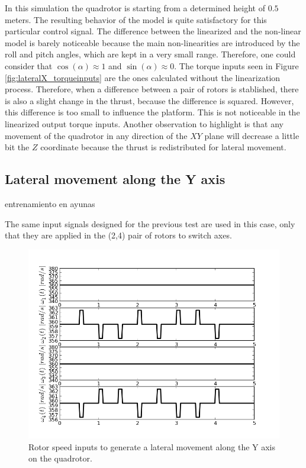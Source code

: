 In this simulation the quadrotor is starting from a determined height of $0.5$ meters. The resulting behavior of the model is quite satisfactory for this particular control signal. The difference between the linearized and the non-linear model is barely noticeable because the main non-linearities are introduced by the roll and pitch angles, which are kept in a very small range. Therefore, one could consider that $\cos{(\alpha)} \approx 1$ and $\sin{(\alpha)} \approx 0$. The torque inputs seen in Figure \ref{fig:lateralX_torqueinputs} are the ones calculated without the linearization process. Therefore, when a difference between a pair of rotors is stablished, there is also a slight change in the thrust, because the difference is squared. However, this difference is too small to influence the platform. This is not noticeable in the linearized output torque inputs. Another observation to highlight is that any movement of the quadrotor in any direction of the $XY$ plane will decrease a little bit the $Z$ coordinate because the thrust is redistributed for lateral movement. \newpage

\subsection{Lateral movement along the Y axis}entrenamiento en ayunas

The same input signals designed for the previous test are used in this case, only that they are applied in the (2,4) pair of rotors to switch axes.

\begin{figure}[H]
\centering
\includegraphics[scale=0.7]{Images/Chapter3/Lateral_Y/Inputs.png}
\caption{Rotor speed inputs to generate a lateral movement along the Y axis on the quadrotor.}
\label{fig:lateralY_inputs}
\end{figure}

